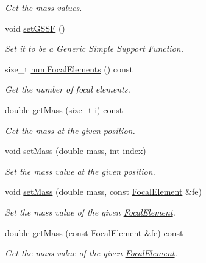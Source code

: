 \begin{DoxyCompactItemize}
\begin{DoxyCompactList}\small\item\em Get the mass values. \end{DoxyCompactList}\item 
void \hyperlink{classEvidence_a9ebbf23d054f6202a8de321c4845341c}{set\+G\+S\+SF} ()
\begin{DoxyCompactList}\small\item\em Set it to be a Generic Simple Support Function. \end{DoxyCompactList}\item 
size\+\_\+t \hyperlink{classEvidence_af58901dda7c77519e3638b95304c4878}{num\+Focal\+Elements} () const 
\begin{DoxyCompactList}\small\item\em Get the number of focal elements. \end{DoxyCompactList}\item 
double \hyperlink{classEvidence_a095c85333b9be60da5e1f359357c23b5}{get\+Mass} (size\+\_\+t i) const 
\begin{DoxyCompactList}\small\item\em Get the mass at the given position. \end{DoxyCompactList}\item 
void \hyperlink{classEvidence_ac12ebfac60dd08a07c3e852e66903520}{set\+Mass} (double mass, \hyperlink{CMakeCache_8txt_a79a3d8790b2588b09777910863574e09}{int} index)
\begin{DoxyCompactList}\small\item\em Set the mass value at the given position. \end{DoxyCompactList}\item 
void \hyperlink{classEvidence_a854a8035ac5f008e9173edcfcf40f071}{set\+Mass} (double mass, const \hyperlink{classFocalElement}{Focal\+Element} \&fe)
\begin{DoxyCompactList}\small\item\em Set the mass value of the given \hyperlink{classFocalElement}{Focal\+Element}. \end{DoxyCompactList}\item 
double \hyperlink{classEvidence_af0aa3b6588833e3d707ce2f413daf46f}{get\+Mass} (const \hyperlink{classFocalElement}{Focal\+Element} \&fe) const 
\begin{DoxyCompactList}\small\item\em Get the mass value of the given \hyperlink{classFocalElement}{Focal\+Element}. \end{DoxyCompactList}\item 

\end{DoxyCompactItemize}
